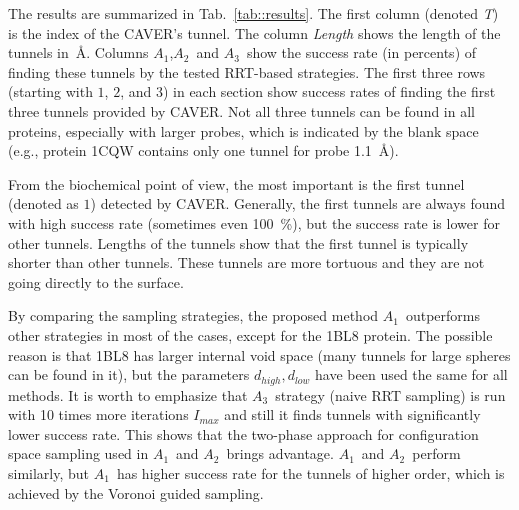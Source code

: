 \documentclass{llncs}
\def\Imax{I_{max}} %
\def\da{d_{high}}
\def\db{d_{low}}
\def\TA{$A_1$}
\def\TB{$A_2$}
\def\TC{$A_3$}
\def\RRTTD{RRT$_{\mathrm{td}}$}
\begin{document}
The results are summarized in Tab.~\ref{tab::results}.
The first column (denoted {\sl T}) is the index of the CAVER's tunnel.
The column {\sl Length} shows the length of the tunnels in~\AA.
Columns \TA,\TB\ and \TC\ show the success rate (in percents) of finding these tunnels by the tested RRT-based strategies.
The first three rows (starting with $1$, $2$, and $3$) in each section show success rates of finding the first three tunnels provided by CAVER.
Not all three tunnels can be found in all proteins, especially with larger probes, which is indicated by the blank space 
(e.g., protein 1CQW contains only one tunnel for probe 1.1~\AA).

From the biochemical point of view, the most important is the first tunnel (denoted as $1$) detected by CAVER.
Generally, the first tunnels are always found with high success rate (sometimes even 100~\%), but the success rate is lower
for other tunnels.
Lengths of the tunnels show that the first tunnel is typically shorter than other tunnels.
These tunnels are more tortuous and they are not going directly to the surface.

By comparing the sampling strategies, the proposed method \TA\ outperforms other strategies in most of the cases, except for the 1BL8 protein.
The possible reason is that 1BL8 has larger internal void space (many tunnels for large spheres can be found in it), but
the parameters $\da,\db$ have been used the same for all methods.
It is worth to emphasize that \TC\ strategy (naive RRT sampling) is run with 10 times more iterations $\Imax$ and still it finds tunnels
with significantly lower success rate.
This shows that the two-phase approach for configuration space sampling used in \TA\ and \TB\ brings advantage.
\TA\ and \TB\ perform similarly, but \TA\ has higher success rate for the tunnels of higher order, which
is achieved by the Voronoi guided sampling.
\end{document}
